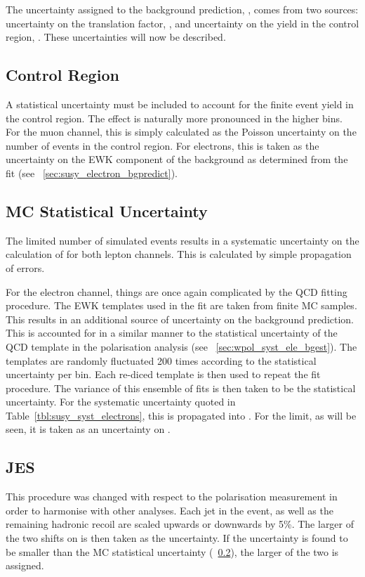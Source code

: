 The uncertainty assigned to the background prediction, \NBkg, comes from two
sources: uncertainty on the translation factor, \RCS, and uncertainty on the
yield in the control region, \NControl. These uncertainties will now be
described.

\subsection{Control Region \texorpdfstring{\LPcontrol}{\LPcontrolBM}}
A statistical uncertainty must be included to account for the finite event yield
in the control region. The effect is naturally more pronounced in the higher
\STlep bins. For the muon channel, this is simply calculated as the Poisson
uncertainty on the number of events in the control region. For electrons, this
is taken as the uncertainty on the \ac{EWK} component of the background as
determined from the fit (see \sec~\ref{sec:susy_electron_bgpredict}).

\subsection{\acl{MC} Statistical Uncertainty}
\label{sec:susy_syst_mcstats}
The limited number of simulated events results in a systematic uncertainty on
the calculation of \RCS for both lepton channels. This is calculated by simple
propagation of errors.

For the electron channel, things are once again complicated by the \ac{QCD}
fitting procedure. The \ac{EWK} templates used in the fit are taken from finite
\ac{MC} samples. This results in an additional source of uncertainty on the
background prediction. This is accounted for in a similar manner to the
statistical uncertainty of the \ac{QCD} template in the \PW polarisation
analysis (see \sec~\ref{sec:wpol_syst_ele_bgest}). The templates are randomly
fluctuated 200 times according to the statistical uncertainty per bin. Each
re-diced template is then used to repeat the fit procedure. The variance of this
ensemble of fits is then taken to be the statistical uncertainty. For the
systematic uncertainty quoted in Table~\ref{tbl:susy_syst_electrons}, this is
propagated into \RCS. For the limit, as will be seen, it is taken as an
uncertainty on \NControl.

\subsection{\acl{JES}}
\label{sec:susy_jes_uncertainty}
This procedure was changed with respect to the \PW polarisation measurement in
order to harmonise with other analyses. Each jet in the event, as well as the
remaining hadronic recoil are scaled upwards or downwards by 5\%. The larger of
the two shifts on \RCS is then taken as the uncertainty. If the uncertainty is
found to be smaller than the \ac{MC} statistical uncertainty
(\sec~\ref{sec:susy_syst_mcstats}), the larger of the two is assigned.

